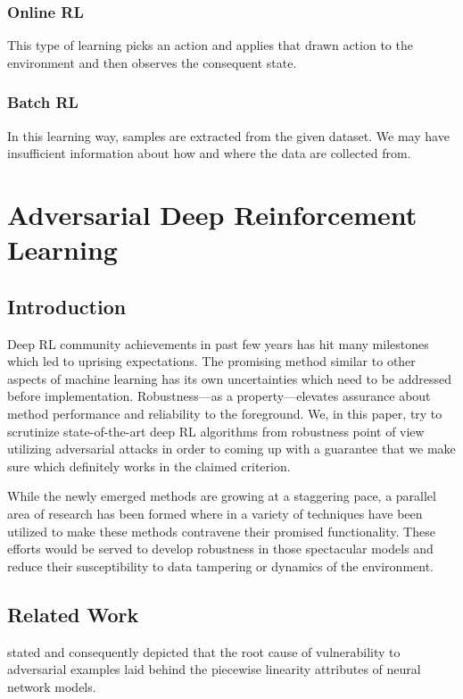 \documentclass[letterpaper,12pt]{article}
\begin{document}
    \subsubsection{Online RL}
    This type of learning picks an action and applies that drawn action to the environment and then observes the consequent state.

    \subsubsection{Batch RL}
    In this learning way, samples are extracted from the given dataset. We may have insufficient information about how and where the data are collected from.


    \section{Adversarial Deep Reinforcement Learning}

    \subsection{Introduction}
    Deep RL community achievements in past few years has hit many milestones which led to uprising expectations. The promising method similar to other aspects of machine learning has its own uncertainties which need to be addressed before implementation. Robustness---as a property---elevates assurance about method performance and reliability to the foreground. We, in this paper, try to scrutinize state-of-the-art deep RL algorithms from robustness point of view utilizing adversarial attacks in order to coming up with a guarantee that we make sure which definitely works in the claimed criterion.

    While the newly emerged methods are growing at a staggering pace, a parallel area of research has been formed where in a variety of techniques have been utilized to make these methods contravene their promised functionality. These efforts would be served to develop robustness in those spectacular models and reduce their susceptibility to data tampering or dynamics of the environment.

    \subsection{Related Work}
    \citet{Goodfellow2014} stated and consequently depicted that the root cause of vulnerability to adversarial examples laid behind the piecewise linearity attributes of neural network models.
\end{document}
